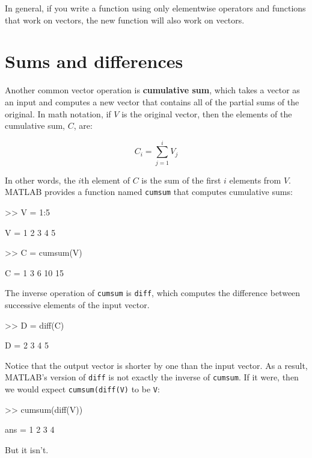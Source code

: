 \documentclass[
]{book}
\numberwithin{Answer}{chapter}
\numberwithin{Exercise}{chapter}
\begin{document}
In general, if you write a function using only elementwise
operators and functions that work on vectors, the new
function will also work on vectors.


\section{Sums and differences}

Another common vector operation is {\bf cumulative sum}, which takes a
vector as an input and computes a new vector that contains all of the
partial sums of the original.  In math notation, if $V$ is the
original vector, then the elements of the cumulative sum, $C$, are:


\begin{equation}
C_i = \sum_{j=1}^i V_j
\end{equation}

In other words, the $i$th element of $C$ is the sum of the first
$i$ elements from $V$.  MATLAB provides a function named {\tt cumsum}
that computes cumulative sums:


\begin{code}
>> V = 1:5

V = 1     2     3     4     5

>> C = cumsum(V)

C = 1     3     6    10    15
\end{code}

The inverse operation of {\tt cumsum} is {\tt diff}, which computes
the difference between successive elements of the input vector.


\begin{code}
>> D = diff(C)

D = 2     3     4     5
\end{code}

Notice that the output vector is shorter by one than the input
vector.  As a result, MATLAB's version of {\tt diff} is not
exactly the inverse of {\tt cumsum}.  If it were, then we would
expect {\tt cumsum(diff(V)} to be {\tt V}:

\begin{code}
>> cumsum(diff(V))

ans = 1     2     3     4
\end{code}

But it isn't.
\end{document}
